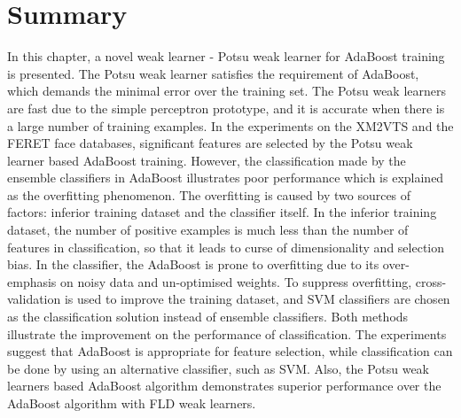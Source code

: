 \section{Summary}
In this chapter, a novel weak learner - Potsu weak learner for AdaBoost training is presented. The Potsu weak learner satisfies the requirement of AdaBoost, which demands the minimal error over the training set. The Potsu weak learners are fast due to the simple perceptron prototype, and it is accurate when there is a large number of training examples. In the experiments on the \mbox{XM2VTS} and the \mbox{FERET} face databases, significant features are selected by the Potsu weak learner based AdaBoost training. However, the classification made by the ensemble classifiers in AdaBoost illustrates poor performance which is explained as the overfitting phenomenon. The overfitting is caused by two sources of factors: inferior training dataset and the classifier itself. In the inferior training dataset, the number of positive examples is much less than the number of features in classification, so that it leads to curse of dimensionality and selection bias. In the classifier, the AdaBoost is prone to overfitting due to its over-emphasis on noisy data and un-optimised weights. To suppress overfitting, cross-validation is used to improve the training dataset, and SVM classifiers are chosen as the classification solution instead of ensemble classifiers. Both methods illustrate the improvement on the performance of classification. The experiments suggest that AdaBoost is appropriate for feature selection, while classification can be done by using an alternative classifier, such as SVM. Also, the Potsu weak learners based AdaBoost algorithm demonstrates superior performance over the AdaBoost algorithm with FLD weak learners.


